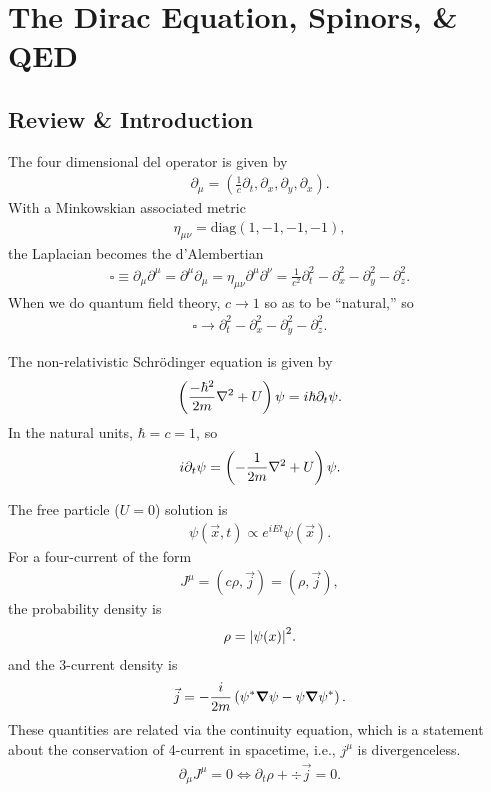 \documentclass{book}
\theoremstyle{definition}
\newcommand{\p}{\partial}
\newcommand{\f}[2]{\frac{#1}{#2}}
\newcommand{\lp}{\left(}
\newcommand{\rp}{\right)}
\begin{document}
\newpage










\section{The Dirac Equation, Spinors, \& QED    } 






\subsection{Review \& Introduction}

The four dimensional del operator is given by
\begin{align}
\p_\mu = \lp \f{1}{c}\p_t, \p_x ,\p_y, \p_x \rp.
\end{align}
With a Minkowskian associated metric
\begin{align}
\eta_{\mu\nu} = \text{diag}(1,-1,-1,-1),
\end{align}
the Laplacian becomes the d'Alembertian
\begin{align}
\square \equiv \p_\mu \p^\mu = \p^\mu \p_\mu = \eta_{\mu\nu}\p^\mu \p^\nu = \f{1}{c^2}\p_t^2 - \p_x^2 - \p_y^2 - \p_z^2.
\end{align}
When we do quantum field theory, $c\to 1$ so as to be ``natural,'' so
\begin{align}
\square \to \p_t^2 - \p_x^2 - \p_y^2 - \p_z^2.
\end{align}

The non-relativistic Schr\"{o}dinger equation is given by
\begin{align}
\lp\f{-\hbar^2}{2m}\laplacian + U\rp \psi = i\hbar \p_t \psi.
\end{align}
In the natural units, $\hbar = c= 1$, so 
\begin{align}
i\p_t \psi = \lp -\f{1}{2m}\laplacian + U \rp\psi.
\end{align}

The free particle ($U=0$) solution is 
\begin{align}
\psi(\vec{x},t) \propto e^{iEt}\psi(\vec{x}).
\end{align}
For a four-current of the form
\begin{align}
J^\mu = (c\rho, \vec{j}) = (\rho, \vec{j}),
\end{align}
the probability density is 
\begin{align}
\rho = \abs{\psi(x)}^2.
\end{align}
and the 3-current density is
\begin{align}
\vec{j} = -\f{i}{2m}\lp \psi^*\grad{\psi} - \psi \grad{\psi^*} \rp.
\end{align}
These quantities are related via the continuity equation, which is a statement about the conservation of 4-current in spacetime, i.e., $j^\mu$ is divergenceless.
\begin{align}
\p_\mu J^\mu = 0 \iff \p_t \rho + \div{\vec{j}} = 0.
\end{align}
\end{document}
